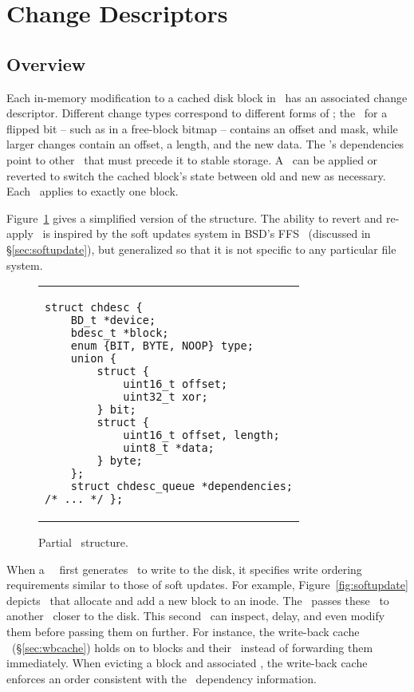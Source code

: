 \section {Change Descriptors}
\label{sec:chdescs}

\subsection {Overview}
Each in-memory modification to a cached disk block in \Kudos\ has an associated
change descriptor. Different change types correspond to different forms of
\chdescs; the \chdesc\ for a flipped bit -- such as in a free-block bitmap --
contains an offset and mask, while larger changes contain an offset, a length,
and the new data. The \chdesc's dependencies point to other \chdescs\ that must
precede it to stable storage. A \chdesc\ can be applied or reverted to switch
the cached block's state between old and new as necessary. Each \chdesc\ applies
to exactly one block.

Figure~\ref{fig:chdesc} gives a simplified version of the structure. The
ability to revert and re-apply \chdescs\ is inspired by the soft updates system
in BSD's FFS~\cite{ganger00soft} (discussed in \S\ref{sec:softupdate}), but
generalized so that it is not specific to any particular file system.

\begin{figure}
\vskip-14pt
\begin{tabular}{@{\hskip0.58in}p{2in}@{}}
\begin{scriptsize}
\begin{verbatim}
struct chdesc {
    BD_t *device;
    bdesc_t *block;
    enum {BIT, BYTE, NOOP} type;
    union {
        struct {
            uint16_t offset;
            uint32_t xor;
        } bit;
        struct {
            uint16_t offset, length;
            uint8_t *data;
        } byte;
    };
    struct chdesc_queue *dependencies;
/* ... */ };
\end{verbatim}
\end{scriptsize}
\end{tabular}
\vspace{-10pt}
\caption{\label{fig:chdesc} Partial \chdesc\ structure.}
\end{figure}

When a \Kudos\ \module\ first generates \chdescs\ to write to the disk, it
specifies write ordering requirements similar to those of soft updates. For
example, Figure~\ref{fig:softupdate} depicts \chdescs\ that allocate and add a
new block to an inode. The \module\ passes these \chdescs\ to another \module\
closer to the disk. This second \module\ can inspect, delay, and even modify
them before passing them on further. For instance, the write-back cache
\module\ (\S\ref{sec:wbcache}) holds on to blocks and their \chdescs\ instead
of forwarding them immediately. When evicting a block and associated \chdescs,
the write-back cache enforces an order consistent with the \chdesc\ dependency
information.

